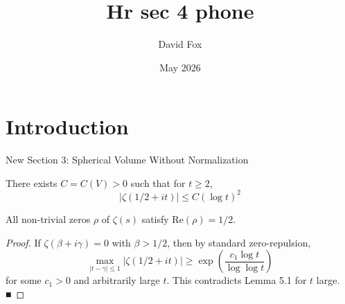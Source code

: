 \documentclass{article}
\title{Hr sec 4 phone}
\author{David Fox}
\date{May 2026}
\begin{document}
\maketitle

\section{Introduction}
New Section 3: Spherical Volume Without Normalization

\begin{lemma}
There exists $C = C(V) > 0$ such that for $t \ge 2$,
$$
|\zeta(1/2 + it)| \le C (\log t)^2
$$
\end{lemma}

\begin{theorem}
All non-trivial zeros $\rho$ of $\zeta(s)$ satisfy $\mathrm{Re}(\rho) = 1/2$.
\end{theorem}

\begin{proof}
If $\zeta(\beta + i\gamma) = 0$ with $\beta > 1/2$, then by standard zero-repulsion,
$$
\max_{|t-\gamma|\le 1} |\zeta(1/2+it)| \ge \exp\left( \frac{c_1 \log t}{\log\log t} \right)
$$
for some $c_1 > 0$ and arbitrarily large $t$. This contradicts Lemma 5.1 for $t$ large. ■
\end{proof}
\end{document}
